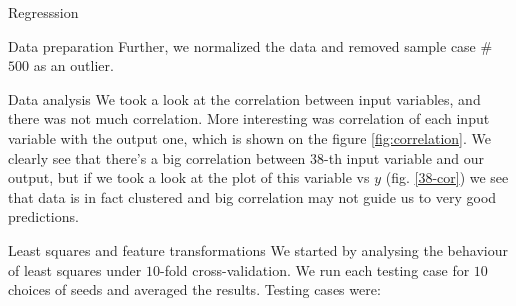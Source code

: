 \documentclass{article}
\begin{document}
\begin{section}{Regresssion}
\begin{subsection}{Data preparation}
Further, we normalized the data and removed sample case \#$500$ as an outlier.
\end{subsection}
\begin{subsection}{Data analysis}
We took a look at the correlation between input variables, and there was not much correlation. More interesting was correlation of each input variable with the output one, which is shown on the figure \ref{fig:correlation}. We clearly see that there's a big correlation between $38$-th input variable and our output, but if we took a look at the plot of this variable vs $y$ (fig. \ref{38-cor}) we see that data is in fact clustered and big correlation may not guide us to very good predictions.
\begin{figure}[!h]
\center
{}
\hfill
{}
\caption{}
\end{figure}
\end{subsection}
\begin{subsection}{Least squares and feature transformations}
We started by analysing the behaviour of least squares under $10$-fold cross-validation. We run each testing case for $10$ choices of seeds and averaged the results. Testing cases were:
\begin{itemize}

\end{itemize}
\end{subsection}
\end{section}
\end{document}
